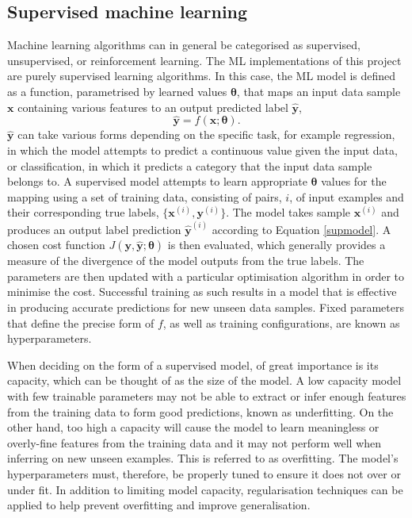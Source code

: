 \documentclass[12pt]{article}
\begin{document}
\subsection{Supervised machine learning}
Machine learning algorithms can in general be categorised as supervised, unsupervised, or reinforcement learning. The ML implementations of this project are purely supervised learning algorithms. In this case, the ML model is defined as a function, parametrised by learned values $\bm{\theta}$, that maps an input data sample $\bm{x}$ containing various features to an output predicted label $\hat{\bm{y}}$,
\begin{equation}
\hat{\bm{y}}=f(\bm{x};\bm{\theta}). \label{supmodel} 
\end{equation}
$\hat{\bm{y}}$ can take various forms depending on the specific task, for example regression, in which the model attempts to predict a continuous value given the input data, or classification, in which it predicts a category that the input data sample belongs to. A supervised model attempts to learn appropriate $\bm{\theta}$ values for the mapping using a set of training data, consisting of pairs, $i$, of input examples and their corresponding true labels, $\lbrace\bm{x}^{(i)},\bm{y}^{(i)}\rbrace$. The model takes sample $\bm{x}^{(i)}$ and produces an output label prediction $\hat{\bm{y}}^{(i)}$ according to Equation \ref{supmodel}. A chosen cost function $J(\bm{y},\hat{\bm{y}};\bm{\theta})$ is then evaluated, which generally provides a measure of the divergence of the model outputs from the true labels. The parameters are then updated with a particular optimisation algorithm in order to minimise the cost. Successful training as such results in a model that is effective in producing accurate predictions for new unseen data samples. Fixed parameters that define the precise form of $f$, as well as training configurations, are known as hyperparameters.

When deciding on the form of a supervised model, of great importance is its capacity, which can be thought of as the size of the model. A low capacity model with few trainable parameters may not be able to extract or infer enough features from the training data to form good predictions, known as underfitting. On the other hand, too high a capacity will cause the model to learn meaningless or overly-fine features from the training data and it may not perform well when inferring on new unseen examples. This is referred to as overfitting. The model's hyperparameters must, therefore, be properly tuned to ensure it does not over or under fit. In addition to limiting model capacity, regularisation techniques can be applied to help prevent overfitting and improve generalisation.
\end{document}
